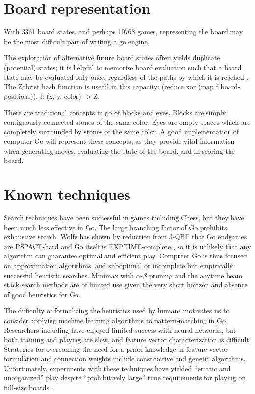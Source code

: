 \documentclass{memoir}
\begin{document}
\section{Board representation}
With 3361 board states, and perhaps 10768 games, representing the board may be the most difficult part of writing a go engine.

The exploration of alternative future board states often yields duplicate (potential) states; it is helpful to memorize board evaluation such that a board state may be evaluated only once, regardless of the paths by which it is reached \cite{Zobrist1970b}. The Zobrist hash function is useful in this capacity: (reduce xor (map f board-positions)), f: (x, y, color) -> Z.

There are traditional concepts in go of blocks and eyes. Blocks are simply contiguously-connected stones of the same color. Eyes are empty spaces which are completely surrounded by stones of the same color. A good implementation of computer Go will represent these concepts, as they provide vital information when generating moves, evaluating the state of the board, and in scoring the board. 

\section{Known techniques}
Search techniques have been successful in games including Chess, but they have been much less effective in Go. The large branching factor of Go prohibits exhaustive search. Wolfe has shown by reduction from 3-QBF that Go endgames are PSPACE-hard \cite{Wolfe} and Go itself is EXPTIME-complete \cite{Burmeister}, so it is unlikely that any algorithm can guarantee optimal and efficient play. Computer Go is thus focused on approximation algorithms, and suboptimal or incomplete but empirically successful heuristic searches. Minimax with $\alpha$-$\beta$ pruning and the anytime beam stack search methods are of limited use given the very short horizon and absence of good heuristics for Go.

The difficulty of formalizing the heuristics used by humans motivates us to consider applying machine learning algorithms to pattern-matching in Go. Researchers including \cite{Enzenberger96} have enjoyed limited success with neural networks, but both training and playing are slow, and feature vector characterization is difficult. Strategies for overcoming the need for a priori knowledge in feature vector formulation and connection weights include constructive and genetic algorithms. Unfortunately, experiments with these techniques have yielded ``erratic and unorganized'' play despite ``prohibitively large'' time requirements for playing on full-size boards \cite{RichardsMM98}.
\end{document}
